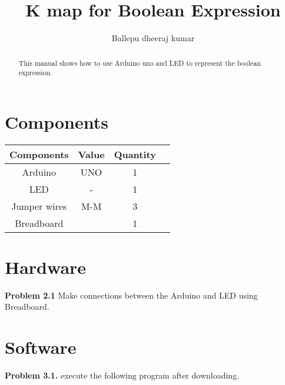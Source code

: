 \documentclass{article}
\title{K map  for Boolean Expression}
\author{Ballepu dheeraj kumar}
\begin{document}
\maketitle
\begin{multicols}{2}
\tableofcontents

\begin{abstract}
 This manual shows how to use Arduino uno and LED to represent the boolean expression.
 
\end{abstract}
\section{Components}

    \centering
    \begin{tabular}{ |c |c |c |c |}
\hline
\textbf{Components} & \textbf{Value} & \textbf{Quantity} \\
\hline
  
 Arduino & UNO & 1 \\  
 
 
 LED & - & 1 \\
 Jumper wires&M-M &3\\
 Breadboard& &1\\
 \hline
 \end{tabular}
 \vspace{3mm}
 
    \label{table1}

\section{Hardware}

\textbf{Problem 2.1} Make connections between the Arduino and LED using Breadboard.
\section{Software}

\textbf{Problem 3.1.} execute the following program after
downloading.
\vspace{10mm}

 \vspace{3mm}
 

\end{multicols}
\end{document}
